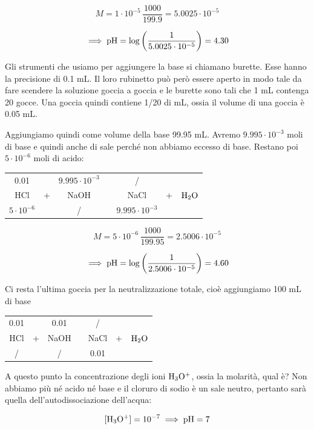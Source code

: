 $$M=1 \cdot 10^{-5} \, \frac{1000}{199.9}=5.0025 \cdot 10^{-5}$$

$$\implies \rm pH=\log \left( \frac{1}{5.0025 \cdot 10^{-5}} \right)=4.30$$

Gli strumenti che usiamo per aggiungere la base si chiamano burette. Esse hanno la precisione di 0.1 mL. Il loro rubinetto può però essere aperto in modo tale da fare scendere la soluzione goccia a goccia e le burette sono tali che 1 mL contenga 20 gocce. Una goccia quindi contiene 1/20 di mL, ossia il volume di una goccia è 0.05 mL.

Aggiungiamo quindi come volume della base 99.95 mL. Avremo $9.995 \cdot 10^{-3}$ moli di base e quindi anche di sale perché non abbiamo eccesso di base. Restano poi $5 \cdot 10^{-6}$ moli di acido:

\begin{center}
    \begin{tabular}{ccccccc}
        0.01 &  & $9.995 \cdot 10^{-3}$  & & / & &\\
        HCl & + & NaOH & \ce{->} & NaCl & + & $\rm H_2O$\\
        $5 \cdot 10^{-6}$ &  &  / & & $9.995 \cdot 10^{-3}$ & &\\
    \end{tabular}
\end{center}

$$M=5 \cdot 10^{-6} \, \frac{1000}{199.95}=2.5006 \cdot 10^{-5}$$

$$\implies \rm pH=\log \left( \frac{1}{2.5006 \cdot 10^{-5}} \right)=4.60$$

Ci resta l'ultima goccia per la neutralizzazione totale, cioè aggiungiamo 100 mL di base

\begin{center}
    \begin{tabular}{ccccccc}
        0.01 &  & 0.01  & & / & &\\
        HCl & + & NaOH & \ce{->} & NaCl & + & $\rm H_2O$\\
        / &  & / & & 0.01 & &\\
    \end{tabular}
\end{center}

A questo punto la concentrazione degli ioni $\rm H_3O^+$, ossia la molarità, qual è? Non abbiamo più né acido né base e il cloruro di sodio è un sale neutro, pertanto sarà quella dell'autodissociazione dell'acqua:

$$\rm [H_3O^+]=10^{-7} \implies pH=7$$

